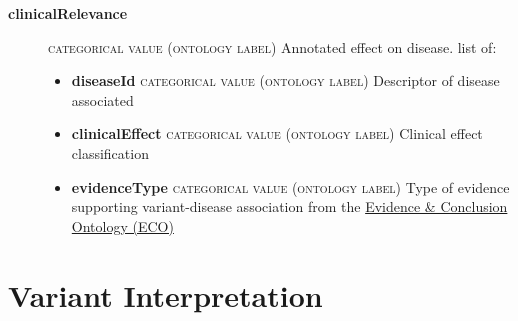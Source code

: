 \documentclass[a4paper, 10pt]{article}        %
\begin{document}
\begin{description}
\begin{itemize}
	\end{itemize} 
\item[\textbf{clinicalRelevance}]  {\textsc{categorical value (ontology label)}} Annotated effect on disease. list of:
	\begin{itemize}
				\item[] \textbf{diseaseId} {\textsc{categorical value (ontology label)}} Descriptor of disease associated
				\item[]  \textbf{clinicalEffect} {\textsc{categorical value (ontology label)}} Clinical effect classification
				\item[]  \textbf{evidenceType} {\textsc{categorical value (ontology label)}} Type of evidence supporting variant-disease association from the \href{http://purl.obolibrary.org/obo/eco.owl}{Evidence \& Conclusion Ontology (ECO)}
	\end{itemize} 
 \end{description}
 
 
 
    	
\section*{ {\color{teal} Variant Interpretation}}
  
\end{document}
